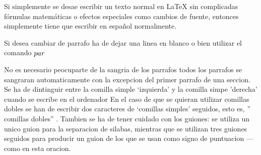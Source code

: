 \documentclass[a4paper,10pt]{letter}
\begin{document}
Si simplemente se desae escribir un texto normal en LaTeX
sin complicadas f\'ormulas matem\'aticas o efectos especiales
como cambios de fuente, entonces simplemente tiene que escribir
en espa\~nol normalmente.\par 
Si desea cambiar de parrafo ha de dejar una linea en blanco o bien
utilizar el comando $\\par$ \par 
No es necesario peocuparte de la sangria de los parrafos
todos los parrafos se sangraran automaticamente con la excepcion 
del primer parrafo de una seccion.  
Se ha de dintinguir entre la comilla simple `izquierda' 
y la comilla simpe 'derecha' cuando se escribe en el ordenador
En el caso de que se quieran utilizar comillas dobles se han de escribir dos caracteres de `comillas simples' seguidos, esto  es, 
'' comillas dobles'' .
Tambien se ha de tener cuidado con los guiones: se utiliza un unico
guion para la separacion de silabas, mientras que se utilizan
tres guiones seguidos para producir un guion de los que se usan 
como signo de puntuacion --- como en esta oracion.
\end{document}
